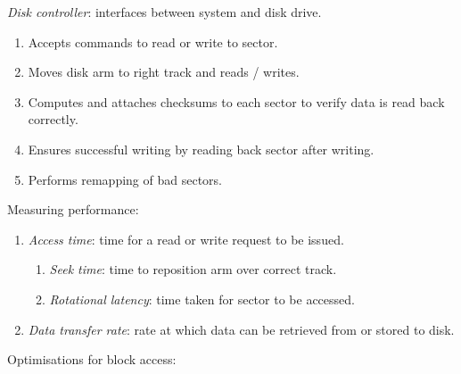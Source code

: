 \documentclass[twocolumn,english]{article}
\begin{document}
\noindent \emph{Disk controller}: interfaces between system and disk
drive.
\begin{enumerate}
\item Accepts commands to read or write to sector.
\item Moves disk arm to right track and reads / writes.
\item Computes and attaches checksums to each sector to verify data is read
back correctly.
\item Ensures successful writing by reading back sector after writing.
\item Performs remapping of bad sectors.
\end{enumerate}
Measuring performance:
\begin{enumerate}
\item \emph{Access time}: time for a read or write request to be issued.

\begin{enumerate}
\item \emph{Seek time}: time to reposition arm over correct track.
\item \emph{Rotational latency}: time taken for sector to be accessed.
\end{enumerate}
\item \emph{Data transfer rate}: rate at which data can be retrieved from
or stored to disk.
\end{enumerate}
Optimisations for block access:
\end{document}
